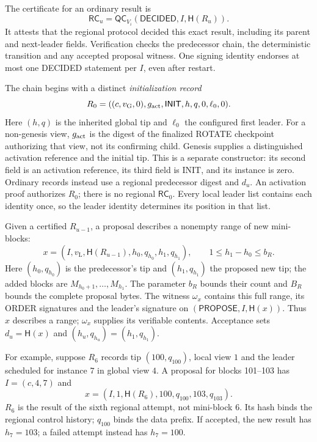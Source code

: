 \documentclass[11pt,a4paper,onecolumn]{article}
\newcommand{\Hash}{\mathsf H}
\newcommand{\QC}{\mathsf{QC}}
\newcommand{\RC}{\mathsf{RC}}
\newcommand{\gv}{v_{\mathrm G}}
\newcommand{\lv}{v_{\mathrm L}}
\newcommand{\Tag}[1]{\mathsf{#1}}
\theoremstyle{remark}\newtheorem{example}[definition]{Example}
\newcounter{protocol}
\begin{document}
The certificate for an ordinary result is
\begin{equation}\label{eq:rc}
 \RC_u=\QC_{V_i}(\Tag{DECIDED},I,\Hash(R_u)).
\end{equation}
It attests that the regional protocol decided this exact result, including its
parent and next-leader fields. Verification checks the predecessor chain,
the deterministic transition and any accepted proposal witness. One signing
identity endorses at most one DECIDED statement per $I$, even after restart.

The chain begins with a distinct \emph{initialization record}
\begin{equation}\label{eq:regionalinit}
 R_0=((c,\gv,0),g_{\rm act},\Tag{INIT},h,q,0,\ell_0,0).
\end{equation}
Here $(h,q)$ is the inherited global tip and $\ell_0$ the configured first
leader. For a non-genesis view, $g_{\rm act}$ is the digest of the finalized
ROTATE checkpoint authorizing that view, not its confirming child. Genesis
supplies a distinguished activation reference and the initial tip.
This is a separate constructor: its second field is an activation reference,
its third field is INIT, and its instance is zero. Ordinary records instead
use a regional predecessor digest and $d_u$. An activation proof authorizes
$R_0$; there is no regional $\RC_0$. Every local leader list contains each
identity once, so the leader identity determines its position in that list.

Given a certified $R_{u-1}$, a proposal describes a nonempty range of new
mini-blocks:
\begin{equation}\label{eq:proposal}
 x=(I,\lv,\Hash(R_{u-1}),h_0,q_{h_0},h_1,q_{h_1}),\qquad
 1\leq h_1-h_0\leq b_R.
\end{equation}
Here $(h_0,q_{h_0})$ is the predecessor's tip and $(h_1,q_{h_1})$ the proposed
new tip; the added blocks are $M_{h_0+1},\ldots,M_{h_1}$. The parameter $b_R$
bounds their count and $B_R$ bounds the complete proposal bytes. The witness
$\omega_x$ contains this full range, its ORDER signatures and the leader's
signature on $(\Tag{PROPOSE},I,\Hash(x))$. Thus $x$ describes a range;
$\omega_x$ supplies its verifiable contents. Acceptance sets
$d_u=\Hash(x)$ and $(h_u,q_{h_u})=(h_1,q_{h_1})$.

For example, suppose $R_6$ records tip $(100,q_{100})$, local view $1$ and the
leader scheduled for instance $7$ in global view $4$. A proposal for blocks
101--103 has $I=(c,4,7)$ and
\[
 x=(I,1,\Hash(R_6),100,q_{100},103,q_{103}).
\]
$R_6$ is the result of the sixth regional attempt, not mini-block 6.
Its hash binds the regional control history; $q_{100}$ binds the data prefix.
If accepted, the new result has $h_7=103$; a failed attempt instead has $h_7=100$.
\end{document}
